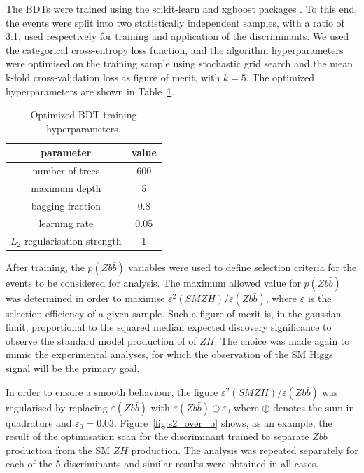 The BDTs were trained using the scikit-learn and xgboost packages . To this end, the events were
split into two statistically independent samples, with a ratio of 3:1, used respectively for training and
application of the discriminants. %
We used the categorical cross-entropy loss function, and the algorithm hyperparameters were
optimised on the training sample using stochastic grid search and the mean
k-fold cross-validation loss as figure of merit, with $k = 5$.
The optimized hyperparameters are shown in Table~\ref{tab:bdt_hpars}.

\begin{table}
\centering
\begin{tabular}{||c|c||}
parameter & value \\
\hline
number of trees & 600 \\
maximum depth & 5 \\
bagging fraction & 0.8 \\
learning rate & 0.05 \\
$L_2$ regularisation strength & 1 \\
\end{tabular}
\caption{
\label{tab:bdt_hpars}
Optimized BDT training hyperparameters.
}
\end{table}

After training, the $p(Z b\bar{b})$ variables were used to define selection criteria
for the events to be considered for analysis. The maximum allowed value for $p(Z b\bar{b})$
was determined in order to maximise $\varepsilon^2(SM Z H) / \varepsilon(Z
b\bar{b})$, where $\varepsilon$ is the selection efficiency of a given sample. Such a
figure of merit is, in the gaussian limit, proportional to the squared median expected
discovery significance to observe the standard model production of of $Z H$.
The choice was made again to mimic the experimental analyses, for which the observation of
the SM Higgs signal will be the primary goal.

In order to ensure a smooth behaviour, the figure $\varepsilon^2(SM Z H) /
\varepsilon(Zb\bar{b})$ was regularised by replacing $\varepsilon(Zb\bar{b})$ with
$\varepsilon(Zb\bar{b}) \oplus \varepsilon_0$ where $\oplus$ denotes the sum in quadrature
and $\varepsilon_0 = 0.03$.
Figure~\ref{fig:s2_over_b} shows, as an example, the result of the optimisation scan for
the discriminant trained to separate $Z b\bar{b}$ production from the SM $Z H$
production. The analysis was repeated separately for each of the 5 discriminants and
similar results were obtained in all cases.

